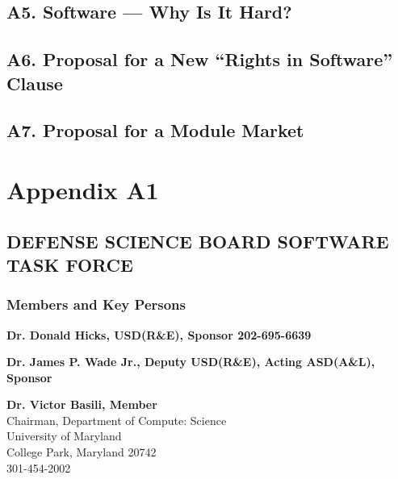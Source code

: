 \documentclass[12pt,final]{article}
\begin{document}
\subsection*{A5. Software — Why Is It Hard?}

\subsection*{A6. Proposal for a New “Rights in Software” Clause}

\subsection*{A7. Proposal for a Module Market}

\newpage

\section*{Appendix A1}
\begin{centering}

\subsection*{DEFENSE SCIENCE BOARD SOFTWARE TASK FORCE}

\subsubsection*{Members and Key Persons}
\end{centering}

\textbf{Dr. Donald Hicks, USD(R\&E), Sponsor 202-695-6639}

\medskip

\textbf{Dr. James P. Wade Jr., Deputy USD(R\&E), Acting ASD(A\&L), Sponsor}

\medskip

\textbf{Dr. Victor Basili, Member}\\
\hspace*{2cm}Chairman, Department of Compute: Science\\
\hspace*{2cm}University of Maryland\\
\hspace*{2cm}College Park, Maryland 20742\\
\hspace*{2cm}301-454-2002

\medskip
\end{document}

